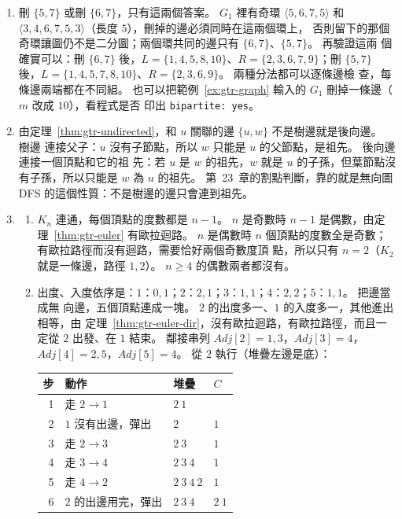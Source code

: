 \begin{enumerate}
\item 刪 $\{5, 7\}$ 或刪 $\{6, 7\}$，只有這兩個答案。 $G_1$ 裡有奇環 $\langle 5, 6, 7, 5
\rangle$ 和 $\langle 3, 4, 6, 7, 5, 3 \rangle$（長度 $5$），刪掉的邊必須同時在這兩個環上，
否則留下的那個奇環讓圖仍不是二分圖；兩個環共同的邊只有 $\{6, 7\}$、$\{5, 7\}$。 再驗證這兩
個確實可以：刪 $\{6, 7\}$ 後，$L = \{1, 4, 5, 8, 10\}$、$R = \{2, 3, 6, 7, 9\}$；刪
$\{5, 7\}$ 後，$L = \{1, 4, 5, 7, 8, 10\}$、$R = \{2, 3, 6, 9\}$。 兩種分法都可以逐條邊檢
查，每條邊兩端都在不同組。 也可以把範例~\ref{ex:gtr-graph} 輸入的 $G_1$ 刪掉一條邊（$m$ 改成 $10$），看程式是否
印出 \texttt{bipartite: yes}。

\item 由定理~\ref{thm:gtr-undirected}，和 $u$ 關聯的邊 $\{u, w\}$ 不是樹邊就是後向邊。 樹邊
連接父子：$u$ 沒有子節點，所以 $w$ 只能是 $u$ 的父節點，是祖先。 後向邊連接一個頂點和它的祖
先：若 $u$ 是 $w$ 的祖先，$w$ 就是 $u$ 的子孫，但葉節點沒有子孫，所以只能是 $w$ 為 $u$ 的祖先。
第~23~章的割點判斷，靠的就是無向圖 DFS 的這個性質：不是樹邊的邊只會連到祖先。
\item
\begin{enumerate}
\item $K_n$ 連通，每個頂點的度數都是 $n - 1$。 $n$ 是奇數時 $n - 1$ 是偶數，由定理~\ref{thm:gtr-euler}
有歐拉迴路。 $n$ 是偶數時 $n$ 個頂點的度數全是奇數；有歐拉路徑而沒有迴路，需要恰好兩個奇數度頂
點，所以只有 $n = 2$（$K_2$ 就是一條邊，路徑 $1, 2$）。 $n \ge 4$ 的偶數兩者都沒有。
\item 出度、入度依序是：$1$：$0, 1$；$2$：$2, 1$；$3$：$1, 1$；$4$：$2, 2$；$5$：$1, 1$。 把邊當成無
向邊，五個頂點連成一塊。 $2$ 的出度多一、$1$ 的入度多一，其他進出相等，由
定理~\ref{thm:gtr-euler-dir}，沒有歐拉迴路，有歐拉路徑，而且一定從 $2$ 出發、在 $1$ 結束。
鄰接串列 $\mathit{Adj}[2] = 1, 3$，$\mathit{Adj}[3] = 4$，$\mathit{Adj}[4] = 2, 5$，$\mathit{Adj}[5] = 4$。
從 $2$ 執行（堆疊左邊是底）：
\begin{center}
\small
\begin{tabular}{rlll}
\toprule
步 & 動作 & 堆疊 & $C$ \\
\midrule
1 & 走 $2 \to 1$ & $2\ 1$ & \\
2 & $1$ 沒有出邊，彈出 & $2$ & $1$ \\
3 & 走 $2 \to 3$ & $2\ 3$ & $1$ \\
4 & 走 $3 \to 4$ & $2\ 3\ 4$ & $1$ \\
5 & 走 $4 \to 2$ & $2\ 3\ 4\ 2$ & $1$ \\
6 & $2$ 的出邊用完，彈出 & $2\ 3\ 4$ & $2\ 1$ \\

\end{tabular}
\end{center}
\end{enumerate}
\end{enumerate}
